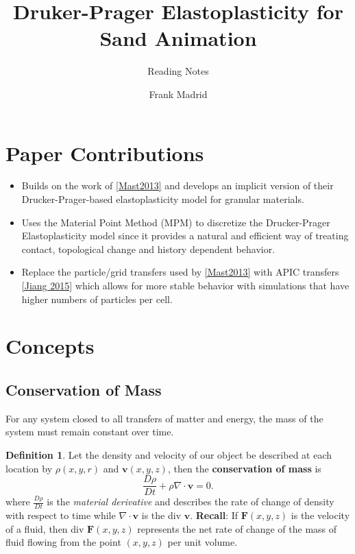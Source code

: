 \documentclass{scrartcl}
\theoremstyle{definition}
\newtheorem{definition}{Definition}
\begin{document}
\title{Druker-Prager Elastoplasticity for Sand Animation}
\subtitle{Reading Notes}
\author{Frank Madrid}
\maketitle

\section{Paper Contributions}
\begin{itemize}
	\item Builds on the work of \ref{Mast2013} and develops an implicit version of their Drucker-Prager-based elastoplasticity model for granular materials.
	\item Uses the Material Point Method (MPM) to discretize the Drucker-Prager Elastoplasticity model since it provides a natural and efficient way of treating contact, topological change and history dependent behavior.
	\item Replace  the particle/grid transfers used by \ref{Mast2013} with APIC transfers \ref{Jiang 2015} which allows for more stable behavior with simulations that have higher numbers of particles per cell.
\end{itemize}


\section{Concepts}

\subsection{Conservation of Mass}
For any system closed to all transfers of matter and energy, the mass of the system must remain constant over time.

\begin{definition}
	Let the density and velocity of our object be described at each location by $\rho(x,y,r)$ and $\textbf{v}(x,y,z)$, then the \textbf{conservation of mass} is
	\begin{equation*}
	\frac{D\rho}{Dt} + \rho\nabla \cdot \textbf{v}=0.
	\end{equation*}
	where $\frac{D\rho}{Dt}$ is the \textit{material derivative} and describes the rate of change of density with respect to time while $\nabla \cdot \textbf{v}$ is the div $\textbf{v}$. \textbf{Recall}: If $\textbf{F}(x,y,z)$ is the velocity of a fluid, then div $\textbf{F}(x,y,z)$ represents the net rate of change of the mass of fluid flowing from the point $(x,y,z)$ per unit volume.
\end{definition}
\end{document}

